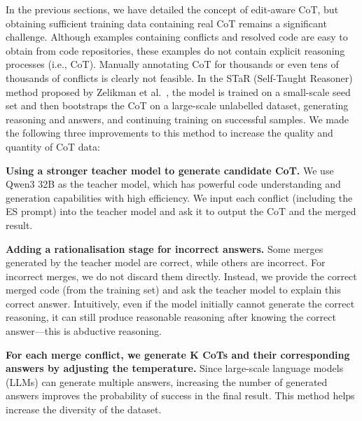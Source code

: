 \documentclass[sigconf,review,anonymous]{acmart}
\newcommand{\stma}[1]{\todo[inline]{\textcolor{black}{#1}}}
\begin{document}
In the previous sections, we have detailed the concept of edit-aware CoT, but obtaining sufficient training data containing real CoT remains a significant challenge. 
Although examples containing conflicts and resolved code are easy to obtain from code repositories, these examples do not contain explicit reasoning processes (i.e., CoT). 
Manually annotating CoT for thousands or even tens of thousands of conflicts is clearly not feasible. 
In the STaR (Self-Taught Reasoner) method proposed by Zelikman et al.~\cite{star}, the model is trained on a small-scale seed set and then bootstraps the CoT on a large-scale unlabelled dataset, generating reasoning and answers, and continuing training on successful samples. 
We made the following three improvements to this method to increase the quality and quantity of CoT data:

\textbf{Using a stronger teacher model to generate candidate CoT.} We use Qwen3 32B as the teacher model, which has powerful code understanding and generation capabilities with high efficiency. We input each conflict (including the ES prompt) into the teacher model and ask it to output the CoT and the merged result.

\textbf{Adding a rationalisation stage for incorrect answers.} Some merges generated by the teacher model are correct, while others are incorrect. For incorrect merges, we do not discard them directly. Instead, we provide the correct merged code (from the training set) and ask the teacher model to explain this correct answer. 
Intuitively, even if the model initially cannot generate the correct reasoning, it can still produce reasonable reasoning after knowing the correct answer—this is abductive reasoning.

\textbf{For each merge conflict, we generate K CoTs and their corresponding answers by adjusting the temperature.} Since large-scale language models (LLMs) can generate multiple answers, increasing the number of generated answers improves the probability of success in the final result. This method helps increase the diversity of the dataset.
\end{document}
